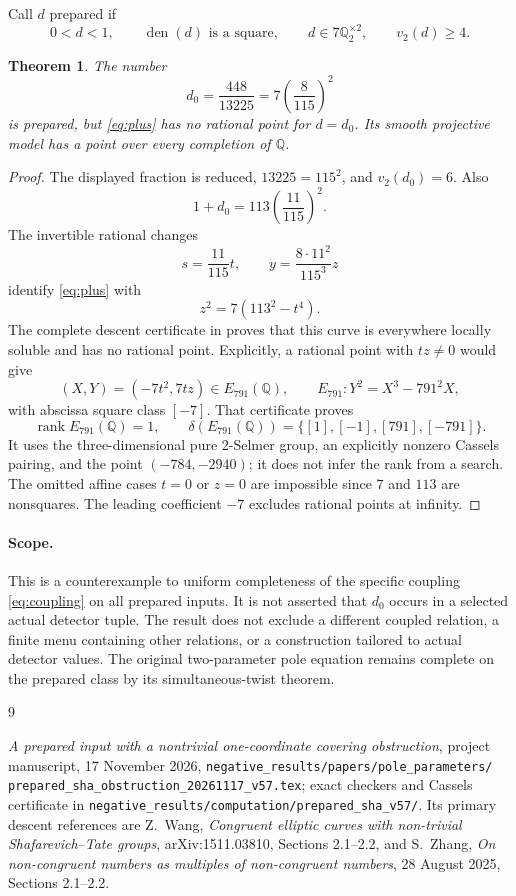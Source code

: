 \documentclass[11pt,a4paper]{article}
\newtheorem{theorem}[proposition]{Theorem}
\newcommand{\Q}{\mathbb Q}
\begin{document}
Call $d$ prepared if
\[
 0<d<1,\qquad \operatorname{den}(d)\text{ is a square},\qquad
 d\in7\Q_2^{\times2},\qquad v_2(d)\ge4.
\]
\begin{theorem}\label{thm:counterexample}
The number
\[
 d_0=\frac{448}{13225}=7\left(\frac8{115}\right)^2
\]
is prepared, but \eqref{eq:plus} has no rational point for $d=d_0$.
Its smooth projective model has a point over every completion of
$\Q$.
\end{theorem}
\begin{proof}
The displayed fraction is reduced, $13225=115^2$, and
$v_2(d_0)=6$. Also
\[
 1+d_0=113\left(\frac{11}{115}\right)^2.
\]
The invertible rational changes
\[
 s=\frac{11}{115}t,\qquad
 y=\frac{8\cdot11^2}{115^3}z
\]
identify \eqref{eq:plus} with
\begin{equation}\label{eq:sha}
 z^2=7(113^2-t^4).
\end{equation}
The complete descent certificate in \cite{Sha} proves that this
curve is everywhere locally soluble and has no rational point.
Explicitly, a rational point with $tz\ne0$ would give
\[
 (X,Y)=(-7t^2,7tz)\in E_{791}(\Q),\qquad
 E_{791}:Y^2=X^3-791^2X,
\]
with abscissa square class $[-7]$. That certificate proves
\[
 \operatorname{rank}E_{791}(\Q)=1,
 \qquad
 \delta(E_{791}(\Q))=\{[1],[-1],[791],[-791]\}.
\]
It uses the three-dimensional pure $2$-Selmer group, an explicitly
nonzero Cassels pairing, and the point $(-784,-2940)$; it does not
infer the rank from a search. The omitted affine cases $t=0$ or
$z=0$ are impossible since $7$ and $113$ are nonsquares. The leading
coefficient $-7$ excludes rational points at infinity.
\end{proof}

\paragraph{Scope.}
This is a counterexample to uniform completeness of the specific
coupling \eqref{eq:coupling} on all prepared inputs. It is not asserted
that $d_0$ occurs in a selected actual detector tuple. The result does
not exclude a different coupled relation, a finite menu containing
other relations, or a construction tailored to actual detector
values. The original two-parameter pole equation remains complete
on the prepared class by its simultaneous-twist theorem.

\begin{thebibliography}{9}
\raggedright
\emph{A prepared input with a nontrivial one-coordinate covering
obstruction}, project manuscript, 17 November 2026,
\texttt{negative\_results/papers/pole\_parameters/}\allowbreak
\texttt{prepared\_sha\_obstruction\_20261117\_v57.tex};
exact checkers and Cassels certificate in
\texttt{negative\_results/computation/prepared\_sha\_v57/}.
Its primary descent references are Z.~Wang,
\emph{Congruent elliptic curves with non-trivial Shafarevich--Tate
groups}, arXiv:1511.03810, Sections 2.1--2.2, and S.~Zhang,
\emph{On non-congruent numbers as multiples of non-congruent numbers},
28 August 2025, Sections 2.1--2.2.
\end{thebibliography}
\end{document}
